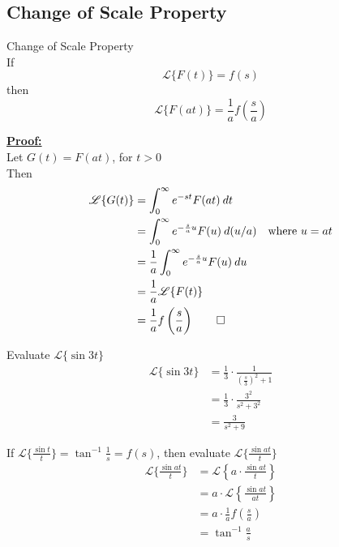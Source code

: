\documentclass[12pt]{article}
\newcommand{\Lap}{\mathscr{L}}
\begin{document}
\subsection{Change of Scale Property}
\begin{theorem}{Change of Scale Property}{}
    \\If \[
        \Lap \{ F(t) \} = f(s)
    \] then \[
        \Lap \{ F(at) \} = \frac{1}{a} f \left( \frac{s}{a} \right)
    \]
\end{theorem}

\underline{\textbf{Proof: }} \\
Let $G(t) = F(at)$, for $t>0$\\
Then\\
\begin{align*}
    \Lap \{ G(t) \} &= \int_{0}^{\infty} {e^{-st}F(at)} \: d{t} \\
    &= \int_{0}^{\infty} {e^{-\frac{s}{a}u}F(u)} \: d{(u/a)} \quad \text{where } u=at \\
    &= \frac{1}{a} \int_{0}^{\infty} {e^{-\frac{s}{a}u}F(u)} \: d{u} \\
    &= \frac{1}{a} \Lap \{ F(t) \} \\
    &= \frac{1}{a} f \left( \frac{s}{a} \right)\qed
\end{align*}

\begin{example}{Evaluate $\Lap \{ \sin{3t} \}$}{}
    \begin{align*}
        \Lap \{ \sin{3t} \} &= \frac{1}{3} \cdot \frac{1}{\left( \frac{s}{3} \right)^2 + 1} \\
        &= \frac{1}{3} \cdot \frac{3^2}{s^2+3^2}\\
        &= \frac{3}{s^2+9}
    \end{align*}
\end{example}

\begin{example}{If $\Lap \{ \frac{\sin{t}}{t} \} = \tan^{-1}{\frac{1}{s}} = f(s)$, then evaluate $\Lap \{ \frac{\sin{at}}{t} \}$}{}
    \begin{align*}
        \Lap \{ \frac{\sin{at}}{t} \} &= \Lap \left\{ a \cdot \frac{\sin{at}}{t} \right\} \\
        &= a \cdot \Lap \left\{ \frac{\sin{at}}{at} \right\} \\
        &= a \cdot \frac{1}{a} f\left(\frac{s}{a}\right) \\
        &= \tan^{-1}{\frac{a}{s}}
    \end{align*}
\end{example}
\end{document}
